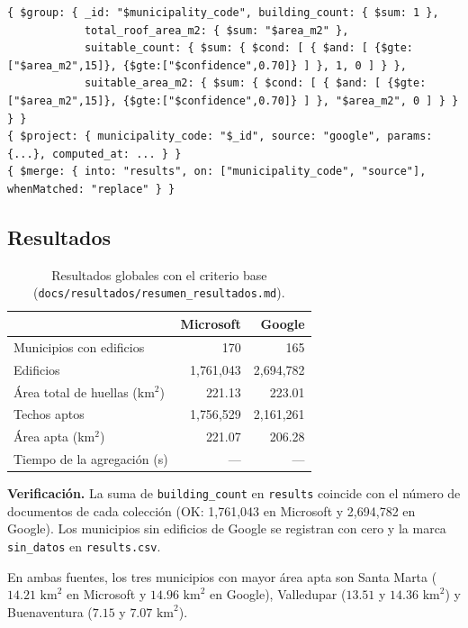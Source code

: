 \begin{lstlisting}[style=lab]
{ $group: { _id: "$municipality_code", building_count: { $sum: 1 },
            total_roof_area_m2: { $sum: "$area_m2" },
            suitable_count: { $sum: { $cond: [ { $and: [ {$gte:["$area_m2",15]}, {$gte:["$confidence",0.70]} ] }, 1, 0 ] } },
            suitable_area_m2: { $sum: { $cond: [ { $and: [ {$gte:["$area_m2",15]}, {$gte:["$confidence",0.70]} ] }, "$area_m2", 0 ] } } } }
{ $project: { municipality_code: "$_id", source: "google", params: {...}, computed_at: ... } }
{ $merge: { into: "results", on: ["municipality_code", "source"], whenMatched: "replace" } }
\end{lstlisting}

\subsection{Resultados}
\begin{table}[H]
\centering
\small
{}
\begin{tabularx}{\textwidth}{X r r}
\toprule
 & \textbf{Microsoft} & \textbf{Google} \\
\midrule
Municipios con edificios & 170 & 165 \\
Edificios & 1{,}761{,}043 & 2{,}694{,}782 \\
Área total de huellas (km$^2$) & 221.13 & 223.01 \\
Techos aptos & 1{,}756{,}529 & 2{,}161{,}261 \\
Área apta (km$^2$) & 221.07 & 206.28 \\
Tiempo de la agregación (s) & --- & --- \\
\bottomrule
\end{tabularx}
\caption{Resultados globales con el criterio base (\texttt{docs/resultados/resumen\_resultados.md}).}
\label{tab:resultados}
\end{table}

\textbf{Verificación.} La suma de \texttt{building\_count} en \texttt{results} coincide con el número de documentos de cada colección (OK: 1{,}761{,}043 en Microsoft y 2{,}694{,}782 en Google). Los municipios sin edificios de Google se registran con cero y la marca \texttt{sin\_datos} en \texttt{results.csv}.

En ambas fuentes, los tres municipios con mayor área apta son Santa Marta ($14.21\text{ km}^2$ en Microsoft y $14.96\text{ km}^2$ en Google), Valledupar ($13.51$ y $14.36\text{ km}^2$) y Buenaventura ($7.15$ y $7.07\text{ km}^2$).
